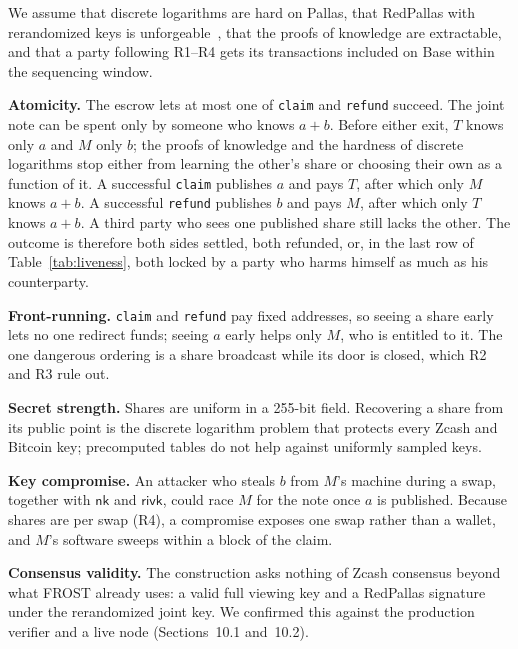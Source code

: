 \documentclass[10pt,letterpaper]{article}
\makeatletter
\renewcommand\section{\@startsection{section}{1}{\z@}{-1.3em}{0.45em}{\normalfont\large\bfseries}}
\newcommand{\nk}{\mathsf{nk}}
\newcommand{\rivk}{\mathsf{rivk}}
\newcommand{\fn}[1]{\texttt{#1}}
\makeatother
\begin{document}
\section{Security}

We assume that discrete logarithms are hard on Pallas, that RedPallas with rerandomized keys is
unforgeable~\cite{spec}, that the proofs of knowledge are extractable, and that a party following
R1--R4 gets its transactions included on Base within the sequencing window.

\textbf{Atomicity.} The escrow lets at most one of \fn{claim} and \fn{refund} succeed. The joint note
can be spent only by someone who knows $a+b$. Before either exit, $T$ knows only $a$ and $M$ only $b$;
the proofs of knowledge and the hardness of discrete logarithms stop either from learning the other's
share or choosing their own as a function of it. A successful \fn{claim} publishes $a$ and pays $T$,
after which only $M$ knows $a+b$. A successful \fn{refund} publishes $b$ and pays $M$, after which only
$T$ knows $a+b$. A third party who sees one published share still lacks the other. The outcome is
therefore both sides settled, both refunded, or, in the last row of Table~\ref{tab:liveness}, both
locked by a party who harms himself as much as his counterparty.

\textbf{Front-running.} \fn{claim} and \fn{refund} pay fixed addresses, so seeing a share early lets
no one redirect funds; seeing $a$ early helps only $M$, who is entitled to it. The one dangerous
ordering is a share broadcast while its door is closed, which R2 and R3 rule out.

\textbf{Secret strength.} Shares are uniform in a 255-bit field. Recovering a share from its public
point is the discrete logarithm problem that protects every Zcash and Bitcoin key; precomputed tables
do not help against uniformly sampled keys.

\textbf{Key compromise.} An attacker who steals $b$ from $M$'s machine during a swap, together with
$\nk$ and $\rivk$, could race $M$ for the note once $a$ is published. Because shares are per swap
(R4), a compromise exposes one swap rather than a wallet, and $M$'s software sweeps within a block of
the claim.

\textbf{Consensus validity.} The construction asks nothing of Zcash consensus beyond what FROST
already uses: a valid full viewing key and a RedPallas signature under the rerandomized joint key.
We confirmed this against the production verifier and a live node (Sections~10.1 and~10.2).
\end{document}
